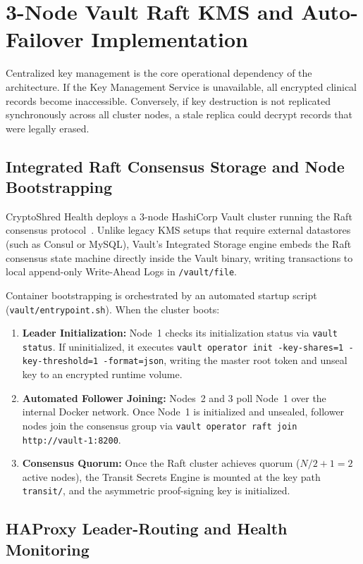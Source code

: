 \section{3-Node Vault Raft KMS and Auto-Failover Implementation}\label{section:impl-vault}

Centralized key management is the core operational dependency of the architecture. If the Key Management Service is unavailable, all encrypted clinical records become inaccessible. Conversely, if key destruction is not replicated synchronously across all cluster nodes, a stale replica could decrypt records that were legally erased.

\subsection{Integrated Raft Consensus Storage and Node Bootstrapping}

CryptoShred Health deploys a 3-node HashiCorp Vault cluster running the Raft consensus protocol~\cite{ongaro_raft_2014}. Unlike legacy KMS setups that require external datastores (such as Consul or MySQL), Vault's Integrated Storage engine embeds the Raft consensus state machine directly inside the Vault binary, writing transactions to local append-only Write-Ahead Logs in \texttt{/vault/file}.

Container bootstrapping is orchestrated by an automated startup script (\texttt{vault/entrypoint.sh}). When the cluster boots:
\begin{enumerate}
    \item \textbf{Leader Initialization:} Node~1 checks its initialization status via \texttt{vault status}. If uninitialized, it executes \texttt{vault operator init -key-shares=1 -key-threshold=1 -format=json}, writing the master root token and unseal key to an encrypted runtime volume.
    \item \textbf{Automated Follower Joining:} Nodes~2 and 3 poll Node~1 over the internal Docker network. Once Node~1 is initialized and unsealed, follower nodes join the consensus group via \texttt{vault operator raft join http://vault-1:8200}.
    \item \textbf{Consensus Quorum:} Once the Raft cluster achieves quorum ($N/2 + 1 = 2$ active nodes), the Transit Secrets Engine is mounted at the key path \texttt{transit/}, and the asymmetric proof-signing key is initialized.
\end{enumerate}

\subsection{HAProxy Leader-Routing and Health Monitoring}

